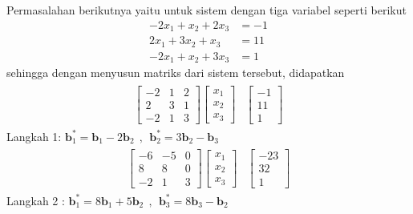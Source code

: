 	
	Permasalahan berikutnya yaitu untuk sistem dengan tiga variabel seperti berikut
	\begin{align*}
		-2x_1 + x_2  + 2x_3 &= -1 \\
		2x_1 + 3x_2  + x_3 &= 11  \\
		-2x_1 + x_2  + 3x_3 &= 1 
	\end{align*}
sehingga dengan menyusun matriks dari sistem tersebut, didapatkan
	\begin{align*}
		\begin{array}{r|r} 
			\left[
			\begin{array}{rrr} 
				-2 & 1 & 2\\
				2 & 3 & 1\\
				-2 &1 & 3 
			\end{array} 
			\right] 
			\left[
			\begin{array}{r} 
				x_1 \\ 
				x_2 \\
				x_3
			\end{array}
			\right] 
			 & \left[
			\begin{array}{r} 
				-1\\
				11\\
				1 
			\end{array} 
			\right]
		\end{array}
	\end{align*}
	Langkah 1: $\textbf{b}^*_1= \textbf{b}_1 - 2\textbf{b}_2~~,~~\textbf{b}^*_2= 3\textbf{b}_2 - \textbf{b}_3$ \\
	\begin{align*}
		\begin{array}{r|r} 
			\left[
			\begin{array}{rrr} 
				-6 & -5 & 0\\
				8 & 8 & 0\\
				-2 &1 & 3 
			\end{array} 
			\right] 
			\left[
			\begin{array}{r} 
				x_1 \\ 
				x_2 \\
				x_3
			\end{array}
			\right]
			 & \left[
			 \begin{array}{r} 
			 	-23\\
			 	32\\
			 	1 
			 \end{array} 
			 \right]
		\end{array}
	\end{align*}
	Langkah 2 : $\textbf{b}^*_1= 8\textbf{b}_1 + 5\textbf{b}_2~~,~~\textbf{b}^*_3= 8\textbf{b}_3 - \textbf{b}_2$ \\
